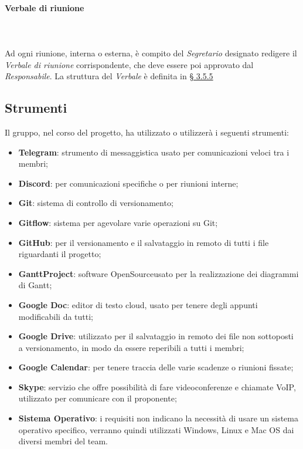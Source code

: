 \paragraph{Verbale di riunione} \mbox{} \\ \mbox{} \\
Ad ogni riunione, interna o esterna, è compito del \textit{Segretario} designato redigere il \textit{Verbale di riunione} corrispondente, che deve essere poi approvato dal \textit{Responsabile}. La struttura del \textit{Verbale} è definita in \hyperref[par:verbali]{§ 3.5.5}


\subsection{Strumenti}
Il gruppo, nel corso del progetto, ha utilizzato o utilizzerà i seguenti strumenti:
\begin{itemize}
	\item \textbf{Telegram}: strumento di messaggistica usato per comunicazioni veloci tra i membri; 
	\item \textbf{Discord}: per comunicazioni specifiche o per riunioni interne;
	\item \textbf{Git}: sistema di controllo di versionamento;
	\item \textbf{Gitflow}: sistema per agevolare varie operazioni su Git;
	\item \textbf{GitHub}: per il versionamento e il salvataggio in remoto di tutti i file riguardanti il progetto;
	\item \textbf{GanttProject}: software OpenSource\glo usato per la realizzazione dei diagrammi di Gantt;
	\item \textbf{Google Doc}: editor di testo cloud, usato per tenere degli appunti modificabili da tutti;
	\item \textbf{Google Drive}: utilizzato per il salvataggio in remoto dei file non sottoposti a versionamento, in modo da essere reperibili a tutti i membri;
	\item \textbf{Google Calendar}: per tenere traccia delle varie scadenze o riunioni fissate;
	\item \textbf{Skype}: servizio che offre possibilità di fare videoconferenze e chiamate VoIP, utilizzato per comunicare con il proponente;
	\item \textbf{Sistema Operativo}: i requisiti non indicano la necessità di usare un sistema operativo specifico, verranno quindi utilizzati Windows, Linux e Mac OS dai diversi membri del team.
\end{itemize}